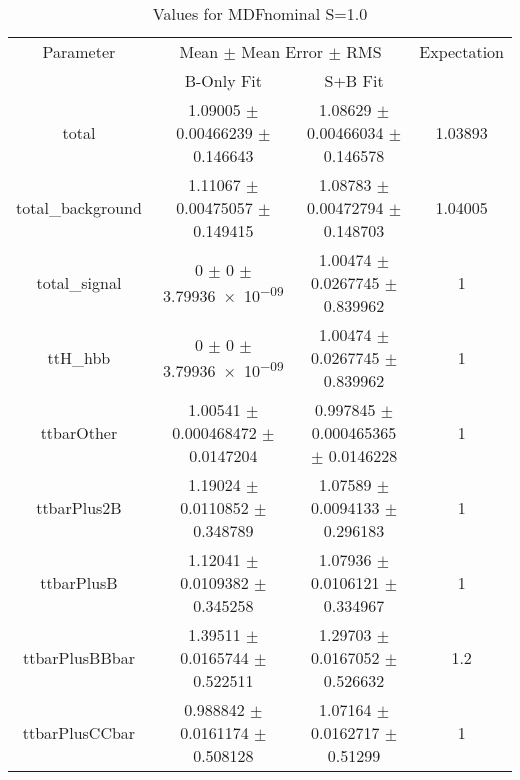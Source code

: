 \begin{table}
\centering
\caption{Values for MDFnominal S=1.0}
\begin{tabular}{cccc}
\toprule
Parameter & \multicolumn{2}{c}{Mean $\pm$ Mean Error $\pm$ RMS} & Expectation\\
 & B-Only Fit & S+B Fit & \\
\midrule
total & \num{1.09005} $\pm$ \num{0.00466239} $\pm$ \num{0.146643} & \num{1.08629} $\pm$ \num{0.00466034} $\pm$ \num{0.146578} & \num{1.03893}\\
total\_background & \num{1.11067} $\pm$ \num{0.00475057} $\pm$ \num{0.149415} & \num{1.08783} $\pm$ \num{0.00472794} $\pm$ \num{0.148703} & \num{1.04005}\\
total\_signal & \num{0} $\pm$ \num{0} $\pm$ \num{3.79936e-09} & \num{1.00474} $\pm$ \num{0.0267745} $\pm$ \num{0.839962} & \num{1}\\
ttH\_hbb & \num{0} $\pm$ \num{0} $\pm$ \num{3.79936e-09} & \num{1.00474} $\pm$ \num{0.0267745} $\pm$ \num{0.839962} & \num{1}\\
ttbarOther & \num{1.00541} $\pm$ \num{0.000468472} $\pm$ \num{0.0147204} & \num{0.997845} $\pm$ \num{0.000465365} $\pm$ \num{0.0146228} & \num{1}\\
ttbarPlus2B & \num{1.19024} $\pm$ \num{0.0110852} $\pm$ \num{0.348789} & \num{1.07589} $\pm$ \num{0.0094133} $\pm$ \num{0.296183} & \num{1}\\
ttbarPlusB & \num{1.12041} $\pm$ \num{0.0109382} $\pm$ \num{0.345258} & \num{1.07936} $\pm$ \num{0.0106121} $\pm$ \num{0.334967} & \num{1}\\
ttbarPlusBBbar & \num{1.39511} $\pm$ \num{0.0165744} $\pm$ \num{0.522511} & \num{1.29703} $\pm$ \num{0.0167052} $\pm$ \num{0.526632} & \num{1.2}\\
ttbarPlusCCbar & \num{0.988842} $\pm$ \num{0.0161174} $\pm$ \num{0.508128} & \num{1.07164} $\pm$ \num{0.0162717} $\pm$ \num{0.51299} & \num{1}\\
\bottomrule
\end{tabular}
\end{table}